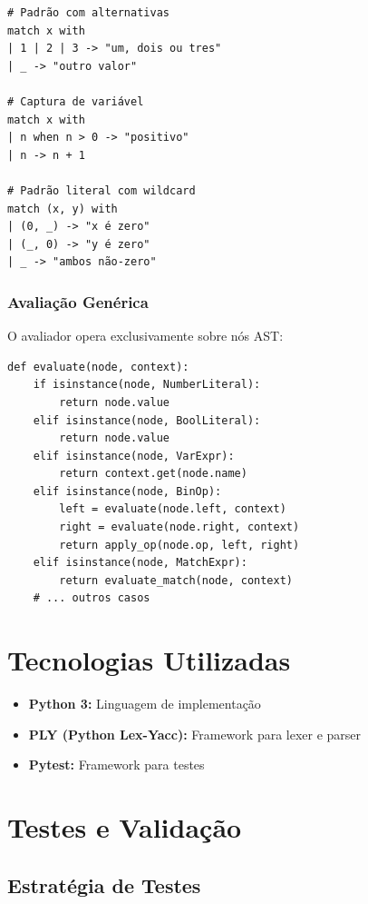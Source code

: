 \documentclass[11pt,a4paper]{report}
\begin{document}
\begin{lstlisting}
# Padrão com alternativas
match x with
| 1 | 2 | 3 -> "um, dois ou tres"
| _ -> "outro valor"

# Captura de variável
match x with
| n when n > 0 -> "positivo"
| n -> n + 1

# Padrão literal com wildcard
match (x, y) with
| (0, _) -> "x é zero"
| (_, 0) -> "y é zero"
| _ -> "ambos não-zero"
\end{lstlisting}

\subsection{Avaliação Genérica}

O avaliador opera exclusivamente sobre nós AST:

\begin{lstlisting}
def evaluate(node, context):
    if isinstance(node, NumberLiteral):
        return node.value
    elif isinstance(node, BoolLiteral):
        return node.value
    elif isinstance(node, VarExpr):
        return context.get(node.name)
    elif isinstance(node, BinOp):
        left = evaluate(node.left, context)
        right = evaluate(node.right, context)
        return apply_op(node.op, left, right)
    elif isinstance(node, MatchExpr):
        return evaluate_match(node, context)
    # ... outros casos
\end{lstlisting}

\chapter{Tecnologias Utilizadas}

\begin{itemize}
    \item \textbf{Python 3:} Linguagem de implementação
    \item \textbf{PLY (Python Lex-Yacc):} Framework para lexer e parser
    \item \textbf{Pytest:} Framework para testes
\end{itemize}

\chapter{Testes e Validação}

\section{Estratégia de Testes}
\end{document}
